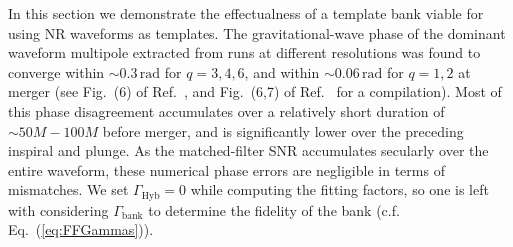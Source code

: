 \documentclass[aps,
prd,
twocolumn,
superscriptaddress,
lengthcheck,showpacs,letterpaper,nofootinbib,
floatfix]{revtex4-1}
\newcommand{\bnk}{\mathrm{bank}}
\newcommand{\Hyb}{\mathrm{Hyb}}
\newcommand{\red}{\textcolor{red}}
\begin{document}
In this section we demonstrate the effectualness of a template bank viable
for using NR waveforms as templates. The gravitational-wave phase of the dominant 
waveform multipole 
extracted from runs at different resolutions was found to converge within 
$\sim 0.3\,\mathrm{rad}$ for $q=3,4,6$, and within $\sim 0.06\,\mathrm{rad}$
for $q=1,2$ at merger (see Fig.~(6) of Ref.~\cite{Buchman:2012dw}, and 
Fig.~(6,7) of Ref.~\cite{BuonannoEOBv2Main} for a compilation). Most of this 
phase disagreement accumulates over a relatively short duration of 
$\sim 50M  - 100M$ before merger, and is significantly lower over the preceding
inspiral and plunge. As the matched-filter SNR accumulates secularly over the
entire waveform, 
these numerical phase errors are negligible in terms of mismatches. We set
$\Gamma_\Hyb = 0$ while computing the fitting factors, so one is left with
considering $\Gamma_\bnk$ to determine the fidelity of the bank (c.f.
Eq.~(\ref{eq:FFGammas})).
\end{document}
